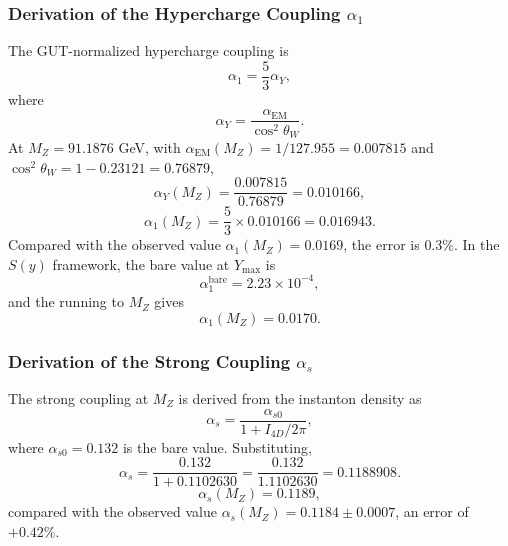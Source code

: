 \documentclass[a4paper,1pt,oneside,openany]{book}
\begin{document}
\subsubsection{Derivation of the Hypercharge Coupling $\alpha_1$}

The GUT-normalized hypercharge coupling is
\begin{equation}
\alpha_1 = \frac{5}{3}\alpha_Y,
\label{eq:alpha1-def}
\end{equation}
where
\begin{equation}
\alpha_Y = \frac{\alpha_{\mathrm{EM}}}{\cos^2\theta_W}.
\label{eq:alphaY}
\end{equation}
At $M_Z = 91.1876$ GeV, with $\alpha_{\mathrm{EM}}(M_Z) = 1/127.955 = 0.007815$ and $\cos^2\theta_W = 1 - 0.23121 = 0.76879$,
\begin{equation}
\alpha_Y(M_Z) = \frac{0.007815}{0.76879} = 0.010166,
\label{eq:alphaY-num}
\end{equation}
\begin{equation}
\alpha_1(M_Z) = \frac{5}{3} \times 0.010166 = 0.016943.
\label{eq:alpha1-num}
\end{equation}
Compared with the observed value $\alpha_1(M_Z) = 0.0169$, the error is $0.3\%$. In the $S(y)$ framework, the bare value at $Y_{\max}$ is
\begin{equation}
\alpha_1^{\mathrm{bare}} = 2.23 \times 10^{-4},
\label{eq:alpha1-bare}
\end{equation}
and the running to $M_Z$ gives
\begin{equation}
\boxed{\alpha_1(M_Z) = 0.0170.}
\label{eq:alpha1-final}
\end{equation}

\subsubsection{Derivation of the Strong Coupling $\alpha_s$}

The strong coupling at $M_Z$ is derived from the instanton density as
\begin{equation}
\alpha_s = \frac{\alpha_{s0}}{1 + I_{4D}/2\pi},
\label{eq:alphas-def}
\end{equation}
where $\alpha_{s0} = 0.132$ is the bare value. Substituting,
\begin{equation}
\alpha_s = \frac{0.132}{1 + 0.1102630} = \frac{0.132}{1.1102630} = 0.1188908.
\label{eq:alphas-num}
\end{equation}
\begin{equation}
\boxed{\alpha_s(M_Z) = 0.1189,}
\label{eq:alphas-final}
\end{equation}
compared with the observed value $\alpha_s(M_Z) = 0.1184 \pm 0.0007$, an error of $+0.42\%$.
\end{document}
